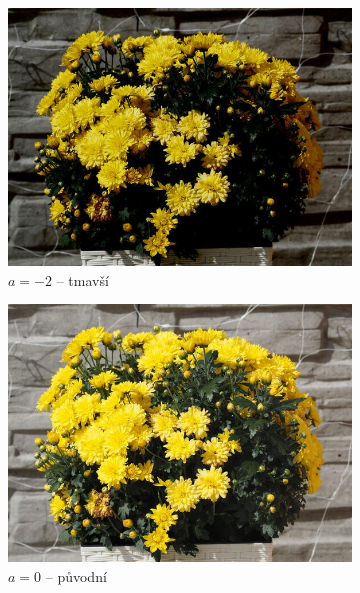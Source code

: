 \documentclass[11pt, a4paper, titlepage]{article}
\begin{document}
\begin{figure}[h]
    \centering
    \begin{subfigure}[t]{0.25\textwidth}
        \vskip 0pt
        \includegraphics[width=1.0\textwidth]{kvetina_mul_down.jpg}
        \caption{$a = -2$ -- tmavší}
    \end{subfigure}
    \hspace{1cm}
    \begin{subfigure}[t]{0.25\textwidth}
        \vskip 0pt
        \includegraphics[width=1.0\textwidth]{kvetina.jpg}
        \caption{$a = 0$ -- původní}
    \end{subfigure}
    \hspace{1cm}
    \begin{subfigure}[t]{0.25\textwidth}

\end{subfigure}
\end{figure}
\end{document}
